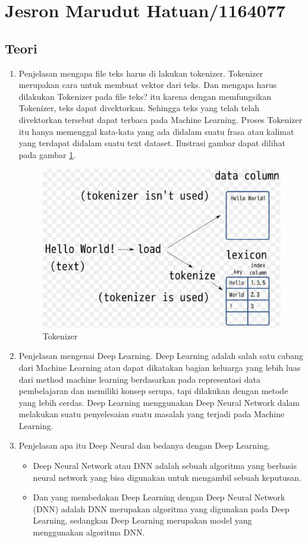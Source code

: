 
\section{Jesron Marudut Hatuan/1164077}
\subsection{Teori}
\begin{enumerate}
\item Penjelasan mengapa file teks harus di lakukan tokenizer.
\subitem Tokenizer merupakan cara untuk membuat vektor dari teks. Dan mengapa harus dilakukan Tokenizer pada file teks? itu karena dengan memfungsikan Tokenizer, teks dapat divektorkan. Sehingga teks yang telah telah divektorkan tersebut dapat terbaca pada Machine Learning. Proses Tokenizer itu hanya memenggal kata-kata yang ada didalam suatu frasa atau kalimat yang terdapat didalam suatu text dataset. Ilustrasi gambar dapat dilihat pada gambar \ref{c7t_1}.
\begin{figure}[!htbp]
	\centerline{\includegraphics[width=1\textwidth]{figures/c7t/1.JPG}}
	\caption{Tokenizer}
	\label{c7t_1}
\end{figure}
\item Penjelasan mengenai Deep Learning.
\subitem Deep Learning adalah salah satu cabang dari Machine Learning atau dapat dikatakan bagian keluarga yang lebih luas dari method machine learning berdasarkan pada representasi data pembelajaran dan memiliki konsep serupa, tapi dilakukan dengan metode yang lebih cerdas. Deep Learning menggunakan Deep Neural Network dalam melakukan suatu penyelesaian suatu masalah yang terjadi pada Machine Learning.
\item Penjelasan apa itu Deep Neural dan bedanya dengan Deep Learning.
\begin{itemize}
\item Deep Neural Network atau DNN adalah sebuah algoritma yang berbasis neural network yang bisa digunakan untuk mengambil sebuah keputusan.
\item Dan yang membedakan Deep Learning dengan Deep Neural Network (DNN) adalah DNN merupakan algoritma yang digunakan pada Deep Learning, sedangkan Deep Learning merupakan model yang menggunakan algoritma DNN.
\end{itemize}
\end{enumerate}